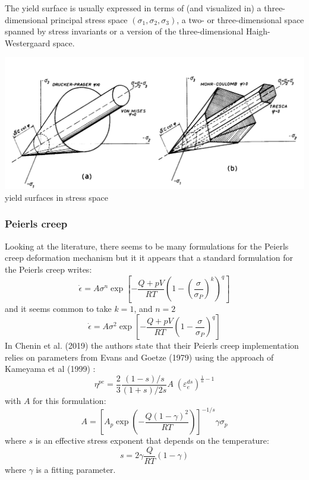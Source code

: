 The yield surface is usually expressed in terms of (and visualized in) a three-dimensional principal stress space $(\sigma_1,\sigma_2,\sigma_3)$, a two- or three-dimensional space spanned by stress invariants 
or a version of the three-dimensional Haigh-Westergaard space. 


\begin{center}
\includegraphics[width=14cm]{images/rheology/surfaces}\\
{\scriptsize yield surfaces in stress space \cite{zico74}}
\end{center} 








\subsubsection{Peierls creep}

Looking at the literature, there seems to be many formulations for the Peierls creep deformation
mechanism but it it appears that a standard formulation for the Peierls creep writes:
\[
\dot{\epsilon} = A \sigma^n \exp \left[ -\frac{Q+pV}{RT} \left(1-(\frac{\sigma}{\sigma_P})^k\right)^q  \right]
\]
and it seems common to take $k=1$, and $n=2$ \cite{gery10,kaka08}
\[
\dot{\epsilon} = A \sigma^2 \exp \left[ -\frac{Q+pV}{RT} \left(1-\frac{\sigma}{\sigma_P}\right)^q  \right]
\]
In Chenin et al. (2019) \cite{chmd19} the authors state that their Peierls creep implementation
relies on parameters from Evans and Goetze (1979) \cite{evgo79} using the approach of 
Kameyama et al (1999) \cite{kayk99}:
\[
\eta^{pe}=\frac{2}{3} \frac{(1-s)/s}{(1+s)/2s} A \; (\varepsilon_e^{ds})^{\frac{1}{n}-1} 
\]
with $A$ for this formulation:
\[
A = \left[ A_p \exp \left( -\frac{Q(1-\gamma)^2}{RT} \right)  \right]^{-1/s} \gamma \sigma_p
\]
where $s$ is an effective stress exponent that depends on the temperature:
\[
s = 2 \gamma \frac{Q}{RT} (1-\gamma)
\]
where $\gamma$ is a fitting parameter. 



